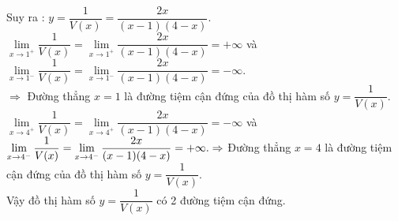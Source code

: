 \begin{bt}
{		Suy ra : $y=\dfrac{1}{V(x)}=\dfrac{2 x}{(x-1)(4-x)}$.\\
		$\lim\limits _{x \rightarrow 1^{+}} \dfrac{1}{V(x)}=\lim\limits _{x \rightarrow 1^{+}} \dfrac{2 x}{(x-1)(4-x)}=+\infty$ và $\lim\limits _{x \rightarrow 1^{-}} \dfrac{1}{V(x)}=\lim\limits _{x \rightarrow 1^{-}} \dfrac{2 x}{(x-1)(4-x)}=-\infty$.\\
		$ \Rightarrow$ Đường thẳng $x=1$ là đường tiệm cận đứng của đồ thị hàm số $y=\dfrac{1}{V(x)}$.\\ 
		$\lim\limits _{x \rightarrow 4^{+}} \dfrac{1}{V(x)}=\lim\limits _{x \rightarrow 4^{+}} \dfrac{2 x}{(x-1)(4-x)}=-\infty$ và $\lim\limits _{x \rightarrow 4^{-}} \dfrac{1}{V(x)}=\lim\limits _{x \rightarrow 4^{-}} \dfrac{2 x}{(x-1)(4-x)}=+\infty.\\ \Rightarrow$ Đường thẳng $x=4$ là đường tiệm cận đứng của đồ thị hàm số $y=\dfrac{1}{V(x)}$.\\
		Vậy đồ thị hàm số $y=\dfrac{1}{V(x)}$ có 2 đường tiệm cận đứng.
	}
\end{bt}

